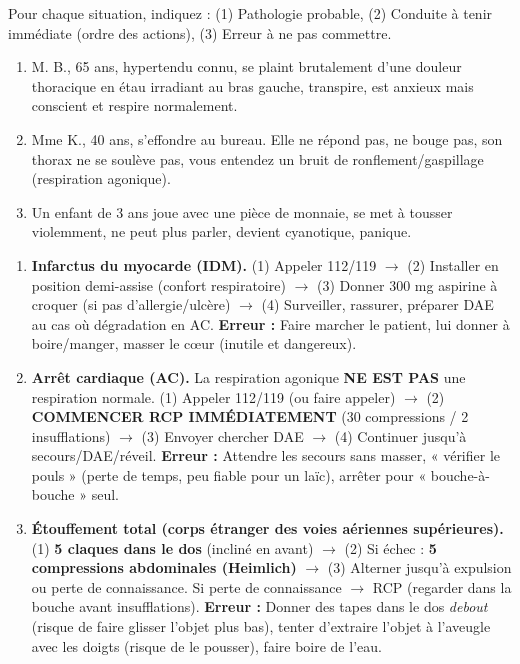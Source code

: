 \documentclass[11pt]{article}
\begin{document}
\begin{exercice}
Pour chaque situation, indiquez : (1) Pathologie probable, (2) Conduite à tenir immédiate (ordre des actions), (3) Erreur à ne pas commettre.
\begin{enumerate}
    \item M. B., 65 ans, hypertendu connu, se plaint brutalement d'une douleur thoracique en étau irradiant au bras gauche, transpire, est anxieux mais conscient et respire normalement.
    \item Mme K., 40 ans, s'effondre au bureau. Elle ne répond pas, ne bouge pas, son thorax ne se soulève pas, vous entendez un bruit de ronflement/gaspillage (respiration agonique).
    \item Un enfant de 3 ans joue avec une pièce de monnaie, se met à tousser violemment, ne peut plus parler, devient cyanotique, panique.
\end{enumerate}
\end{exercice}

\begin{corrige}
\begin{enumerate}
    \item \textbf{Infarctus du myocarde (IDM).} (1) Appeler 112/119 $\rightarrow$ (2) Installer en position demi-assise (confort respiratoire) $\rightarrow$ (3) Donner 300 mg aspirine à croquer (si pas d'allergie/ulcère) $\rightarrow$ (4) Surveiller, rassurer, préparer DAE au cas où dégradation en AC. \textbf{Erreur :} Faire marcher le patient, lui donner à boire/manger, masser le cœur (inutile et dangereux).
    \item \textbf{Arrêt cardiaque (AC).} La respiration agonique \textbf{NE EST PAS} une respiration normale. (1) Appeler 112/119 (ou faire appeler) $\rightarrow$ (2) \textbf{COMMENCER RCP IMMÉDIATEMENT} (30 compressions / 2 insufflations) $\rightarrow$ (3) Envoyer chercher DAE $\rightarrow$ (4) Continuer jusqu'à secours/DAE/réveil. \textbf{Erreur :} Attendre les secours sans masser, « vérifier le pouls » (perte de temps, peu fiable pour un laïc), arrêter pour « bouche-à-bouche » seul.
    \item \textbf{Étouffement total (corps étranger des voies aériennes supérieures).} (1) \textbf{5 claques dans le dos} (incliné en avant) $\rightarrow$ (2) Si échec : \textbf{5 compressions abdominales (Heimlich)} $\rightarrow$ (3) Alterner jusqu'à expulsion ou perte de connaissance. Si perte de connaissance $\rightarrow$ RCP (regarder dans la bouche avant insufflations). \textbf{Erreur :} Donner des tapes dans le dos \emph{debout} (risque de faire glisser l'objet plus bas), tenter d'extraire l'objet à l'aveugle avec les doigts (risque de le pousser), faire boire de l'eau.
\end{enumerate}
\end{corrige}
\end{document}
